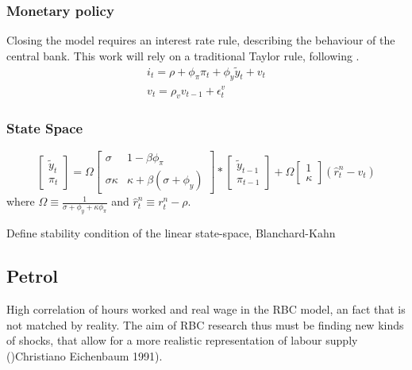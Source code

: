 \documentclass[12pt,a4paper,english]{article} %
\begin{document}
	\subsubsection{Monetary policy}
	
	Closing the model requires an interest rate rule, describing the behaviour of the central bank. This work will rely on a traditional Taylor rule, following \cite{gali_monetary_2008}.
	\begin{equation}
		\begin{aligned}
			i_t = \rho + \phi_{\pi} \pi_t + \phi_{y} \tilde{y}_t + v_t \\
			v_t = \rho_v v_{t-1} + \epsilon_t^v
		\end{aligned}
	\end{equation}

	\subsubsection{State Space}
	\begin{equation}
		\begin{bmatrix}
			\tilde{y}_t \\
			\pi_t
		\end{bmatrix}
		=
		\Omega
		\begin{bmatrix}
			\sigma & 1 - \beta \phi_{\pi} \\
			\sigma \kappa & \kappa + \beta (\sigma + \phi_y)
		\end{bmatrix}
		*
		\begin{bmatrix}
			\tilde{y}_{t-1} \\
			\pi_{t-1}
		\end{bmatrix}
		+
		\Omega
		\begin{bmatrix}
			1 \\
			\kappa
		\end{bmatrix}	
		(\hat{r}_t^n - v_t)
	\end{equation}
	where $\Omega \equiv \frac{1}{\sigma + \phi_y + \kappa \phi_{\pi}}$ and $\hat{r}_t^n \equiv r_t^n - \rho$.
	
	Define stability condition of the linear state-space, Blanchard-Kahn

	\subsection{Petrol}
	High correlation of hours worked and real wage in the RBC model, an fact that is not matched by reality. The aim of RBC research thus must be finding new kinds of shocks, that allow for a more realistic representation of labour supply ()Christiano Eichenbaum 1991).
	
\end{document}
